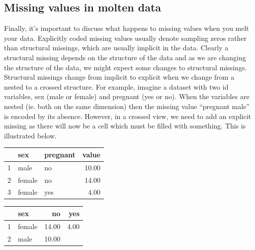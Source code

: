\documentclass[oneside,letterpaper]{scrartcl}
\begin{document}
\subsection{Missing values in molten data}\label{sub:missing_values}

Finally, it's important to discuss what happens to missing values when you melt your data.  Explicitly coded missing values usually denote sampling zeros rather than structural missings, which are usually implicit in the data.  Clearly a structural missing depends on the structure of the data and as we are changing the structure of the data, we might expect some changes to structural missings.  Structural missings change from implicit to explicit when we change from a nested to a crossed structure.  For example, imagine a dataset with two id variables, sex (male or female) and pregnant (yes or no).  When the variables are nested (ie. both on the same dimension) then the missing value ``pregnant male'' is encoded by its absence.  However, in a crossed view, we need to add an explicit missing as there will now be a cell which must be filled with something.  This is illustrated below.

\begin{table}[ht]
\begin{center}
\begin{tabular}{rllr}
\hline
 & sex & pregnant & value \\
\hline
1 & male & no & 10.00 \\
2 & female & no & 14.00 \\
3 & female & yes & 4.00 \\
\hline
\end{tabular}
\end{center}
\end{table}

\begin{table}[ht]
\begin{center}
\begin{tabular}{rlrr}
\hline
 & sex & no & yes \\
\hline
1 & female & 14.00 & 4.00 \\
2 & male & 10.00 &  \\
\hline
\end{tabular}
\end{center}
\end{table}
\end{document}
